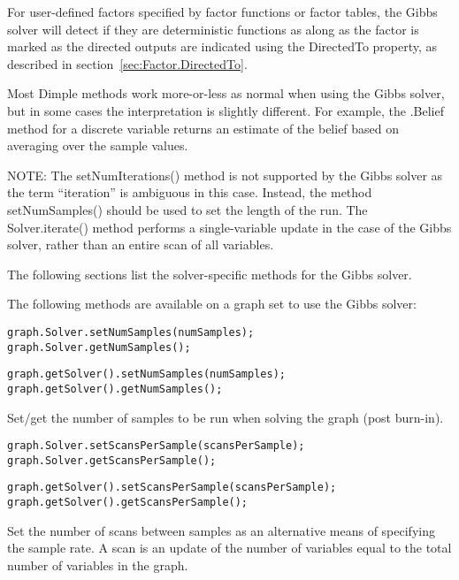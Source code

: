 \ifjava
For user-defined factors specified by factor functions or factor tables, the Gibbs solver will detect if they are deterministic functions as along as the factor is marked as the directed outputs are indicated using the DirectedTo property, as described in section~\ref{sec:Factor.DirectedTo}.
\fi
 

Most Dimple methods work more-or-less as normal when using the Gibbs solver, but in some cases the interpretation is slightly different. For example, the .Belief method for a discrete variable returns an estimate of the belief based on averaging over the sample values.

NOTE: The setNumIterations() method is not supported by the Gibbs solver as the term ``iteration'' is ambiguous in this case. Instead, the method setNumSamples() should be used to set the length of the run. The Solver.iterate() method performs a single-variable update in the case of the Gibbs solver, rather than an entire scan of all variables.

The following sections list the solver-specific methods for the Gibbs solver.


The following methods are available on a graph set to use the Gibbs solver:

\ifmatlab
\begin{lstlisting}
graph.Solver.setNumSamples(numSamples);
graph.Solver.getNumSamples();
\end{lstlisting}
\fi

\ifjava
\begin{lstlisting}
graph.getSolver().setNumSamples(numSamples);
graph.getSolver().getNumSamples();
\end{lstlisting}
\fi

Set/get the number of samples to be run when solving the graph (post burn-in).

\ifmatlab
\begin{lstlisting}
graph.Solver.setScansPerSample(scansPerSample);
graph.Solver.getScansPerSample();
\end{lstlisting}
\fi

\ifjava
\begin{lstlisting}
graph.getSolver().setScansPerSample(scansPerSample);
graph.getSolver().getScansPerSample();
\end{lstlisting}
\fi

Set the number of scans between samples as an alternative means of specifying the sample rate. A scan is an update of the number of variables equal to the total number of variables in the graph.

